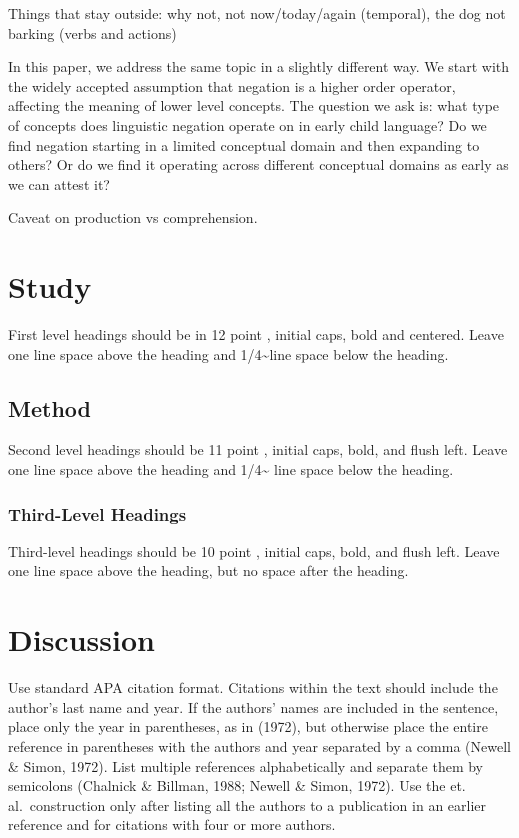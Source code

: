 \documentclass[10pt, letterpaper]{article}
\begin{document}
Things that stay outside: why not, not now/today/again (temporal), the
dog not barking (verbs and actions)

In this paper, we address the same topic in a slightly different way. We
start with the widely accepted assumption that negation is a higher
order operator, affecting the meaning of lower level concepts. The
question we ask is: what type of concepts does linguistic negation
operate on in early child language? Do we find negation starting in a
limited conceptual domain and then expanding to others? Or do we find it
operating across different conceptual domains as early as we can attest
it?

Caveat on production vs comprehension.

\hypertarget{study}{%
\section{Study}\label{study}}

First level headings should be in 12 point , initial caps, bold and
centered. Leave one line space above the heading and
1/4\textasciitilde line space below the heading.

\hypertarget{method}{%
\subsection{Method}\label{method}}

Second level headings should be 11 point , initial caps, bold, and flush
left. Leave one line space above the heading and 1/4\textasciitilde{}
line space below the heading.

\hypertarget{third-level-headings}{%
\subsubsection{Third-Level Headings}\label{third-level-headings}}

Third-level headings should be 10 point , initial caps, bold, and flush
left. Leave one line space above the heading, but no space after the
heading.

\hypertarget{discussion}{%
\section{Discussion}\label{discussion}}

Use standard APA citation format. Citations within the text should
include the author's last name and year. If the authors' names are
included in the sentence, place only the year in parentheses, as in
(1972), but otherwise place the entire reference in parentheses with the
authors and year separated by a comma (Newell \& Simon, 1972). List
multiple references alphabetically and separate them by semicolons
(Chalnick \& Billman, 1988; Newell \& Simon, 1972). Use the et.
al.~construction only after listing all the authors to a publication in
an earlier reference and for citations with four or more authors.
\end{document}
